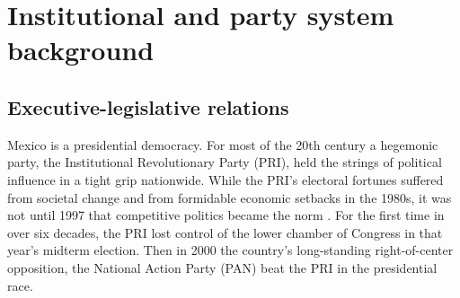 \documentclass[letter,12pt]{article}
\begin{document}
\section{Institutional and party system background} %







\subsection{Executive-legislative relations}

Mexico is a presidential democracy. For most of the 20th century a hegemonic party, the Institutional Revolutionary Party (PRI), held the strings of political influence in a tight grip nationwide. While the PRI's electoral fortunes suffered from societal change and from formidable economic setbacks in the 1980s, it was not until 1997 that competitive politics became the norm \citep{scott.1959,cosio.villegas.1981,molinar.1991a,cornelius.1996}. For the first time in over six decades, the PRI lost control of the lower chamber of Congress in that year's midterm election. Then in 2000 the country's long-standing right-of-center opposition, the National Action Party (PAN) beat the PRI in the presidential race.  
\end{document}
